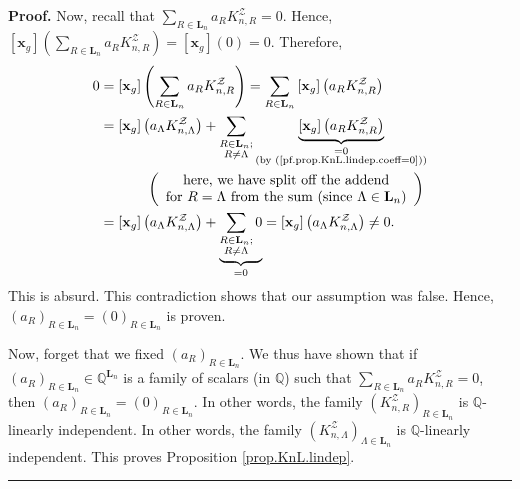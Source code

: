 \documentclass[numbers=enddot,12pt,final,onecolumn,notitlepage]{scrartcl}%
\theoremstyle{definition}
\newenvironment{proof}[1][Proof]{\noindent\textbf{#1.} }{\ \rule{0.5em}{0.5em}}
\newenvironment{verlong}{}{}
\let\sumnonlimits\sum
\renewcommand{\sum}{\sumnonlimits\limits}
\begin{document}
\begin{proof}
\begin{verlong}
Now, recall that $\sum_{R\in\mathbf{L}_{n}}a_{R}K_{n,R}^{\mathcal{Z}}=0$.
Hence, $\left[  \mathbf{x}_{g}\right]  \left(  \sum_{R\in\mathbf{L}_{n}}%
a_{R}K_{n,R}^{\mathcal{Z}}\right)  =\left[  \mathbf{x}_{g}\right]  \left(
0\right)  =0$. Therefore,%
\begin{align*}
0 &  =\left[  \mathbf{x}_{g}\right]  \left(  \sum_{R\in\mathbf{L}_{n}}%
a_{R}K_{n,R}^{\mathcal{Z}}\right)  =\sum_{R\in\mathbf{L}_{n}}\left[
\mathbf{x}_{g}\right]  \left(  a_{R}K_{n,R}^{\mathcal{Z}}\right)  \\
&  =\left[  \mathbf{x}_{g}\right]  \left(  a_{\Lambda}K_{n,\Lambda
}^{\mathcal{Z}}\right)  +\sum_{\substack{R\in\mathbf{L}_{n};\\R\neq\Lambda
}}\underbrace{\left[  \mathbf{x}_{g}\right]  \left(  a_{R}K_{n,R}%
^{\mathcal{Z}}\right)  }_{\substack{=0\\\text{(by
(\ref{pf.prop.KnL.lindep.coeff=0}))}}}\\
&  \ \ \ \ \ \ \ \ \ \ \left(
\begin{array}
[c]{c}%
\text{here, we have split off the addend}\\
\text{for }R=\Lambda\text{ from the sum (since }\Lambda\in\mathbf{L}%
_{n}\text{)}%
\end{array}
\right)  \\
&  =\left[  \mathbf{x}_{g}\right]  \left(  a_{\Lambda}K_{n,\Lambda
}^{\mathcal{Z}}\right)  +\underbrace{\sum_{\substack{R\in\mathbf{L}%
_{n};\\R\neq\Lambda}}0}_{=0}=\left[  \mathbf{x}_{g}\right]  \left(
a_{\Lambda}K_{n,\Lambda}^{\mathcal{Z}}\right)  \neq0.
\end{align*}
This is absurd. This contradiction shows that our assumption was false. Hence,
$\left(  a_{R}\right)  _{R\in\mathbf{L}_{n}}=\left(  0\right)  _{R\in
\mathbf{L}_{n}}$ is proven.
\end{verlong}

Now, forget that we fixed $\left(  a_{R}\right)  _{R\in\mathbf{L}_{n}}$. We
thus have shown that if $\left(  a_{R}\right)  _{R\in\mathbf{L}_{n}}%
\in\mathbb{Q}^{\mathbf{L}_{n}}$ is a family of scalars (in $\mathbb{Q}$) such
that $\sum_{R\in\mathbf{L}_{n}}a_{R}K_{n,R}^{\mathcal{Z}}=0$, then $\left(
a_{R}\right)  _{R\in\mathbf{L}_{n}}=\left(  0\right)  _{R\in\mathbf{L}_{n}}$.
In other words, the family $\left(  K_{n,R}^{\mathcal{Z}}\right)
_{R\in\mathbf{L}_{n}}$ is $\mathbb{Q}$-linearly independent. In other words,
the family $\left(  K_{n,\Lambda}^{\mathcal{Z}}\right)  _{\Lambda\in
\mathbf{L}_{n}}$ is $\mathbb{Q}$-linearly independent. This proves Proposition
\ref{prop.KnL.lindep}.
\end{proof}
\end{document}
